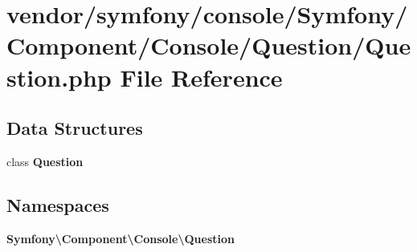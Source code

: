 \section{vendor/symfony/console/\+Symfony/\+Component/\+Console/\+Question/\+Question.php File Reference}
\label{_question_8php}
\subsection*{Data Structures}
\begin{DoxyCompactItemize}
\item 
class {\bf Question}
\end{DoxyCompactItemize}
\subsection*{Namespaces}
\begin{DoxyCompactItemize}
\item 
 {\bf Symfony\textbackslash{}\+Component\textbackslash{}\+Console\textbackslash{}\+Question}
\end{DoxyCompactItemize}

